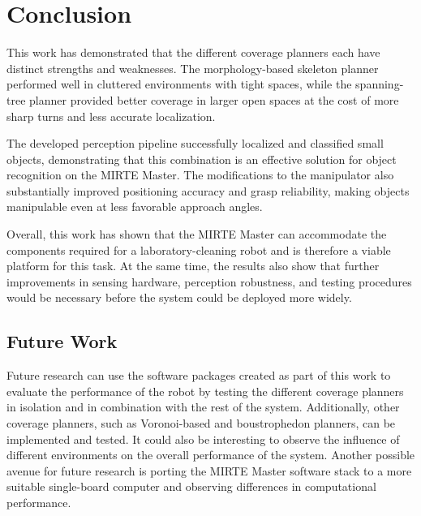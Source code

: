 \section{Conclusion}

This work has demonstrated that the different coverage planners each have distinct strengths and weaknesses. The morphology-based skeleton planner performed well in cluttered environments with tight spaces, while the spanning-tree planner provided better coverage in larger open spaces at the cost of more sharp turns and less accurate localization.

The developed perception pipeline successfully localized and classified small objects, demonstrating that this combination is an effective solution for object recognition on the MIRTE Master. The modifications to the manipulator also substantially improved positioning accuracy and grasp reliability, making objects manipulable even at less favorable approach angles.

Overall, this work has shown that the MIRTE Master can accommodate the components required for a laboratory-cleaning robot and is therefore a viable platform for this task. At the same time, the results also show that further improvements in sensing hardware, perception robustness, and testing procedures would be necessary before the system could be deployed more widely.

\subsection{Future Work}

Future research can use the software packages created as part of this work to evaluate the performance of the robot by testing the different coverage planners in isolation and in combination with the rest of the system. Additionally, other coverage planners, such as Voronoi-based \cite{voronoi} and boustrophedon \cite{Choset1997} planners, can be implemented and tested. It could also be interesting to observe the influence of different environments on the overall performance of the system. Another possible avenue for future research is porting the MIRTE Master software stack to a more suitable single-board computer and observing differences in computational performance.
